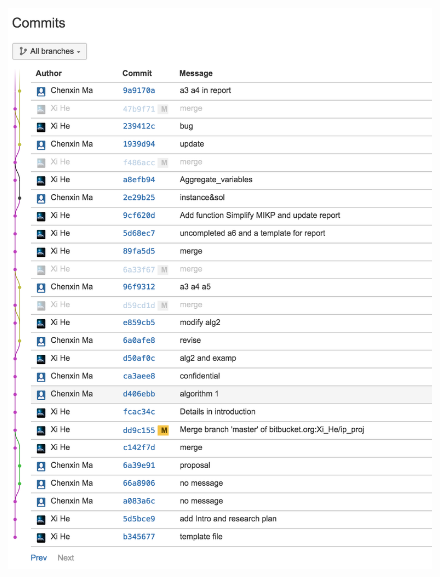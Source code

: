 \documentclass[a4paper,10pt]{article}
\begin{document}
\begin{figure}[H]
\begin{center}
\includegraphics[scale=0.8]{git_2}
\end{center}
\end{figure}
\end{document}
